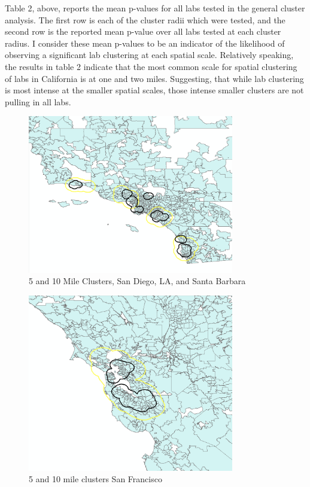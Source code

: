 \documentclass[12pt,letterpaper]{article}
\begin{document}
\begin{table}[H]
\centering
{}
\caption{}
\label{tab:my-table}
\end{table}
Table 2, above, reports the mean p-values for all labs tested in the general cluster analysis. The first row is each of the cluster radii which were tested, and the second row is the reported mean p-value over all labs tested at each cluster radius. I consider these mean p-values to be an indicator of the likelihood of observing a significant lab clustering at each spatial scale. Relatively speaking, the results in table 2 indicate that the most common scale for spatial clustering of labs in California is at one and two miles. Suggesting, that while lab clustering is most intense at the smaller spatial scales, those intense smaller clusters are not pulling in all labs. 
\begin{figure}[H]
    \centering
    \includegraphics[width=9cm]{LA.png}
    \caption{5 and 10 Mile Clusters, San Diego, LA, and Santa Barbara}
    \label{fig:my_label}
\end{figure}
\begin{figure}[H]
    \centering
    \includegraphics[width=9cm]{SF.png}
    \caption{5 and 10 mile clusters San Francisco}
    \label{fig:my_label}
\end{figure}
\end{document}
